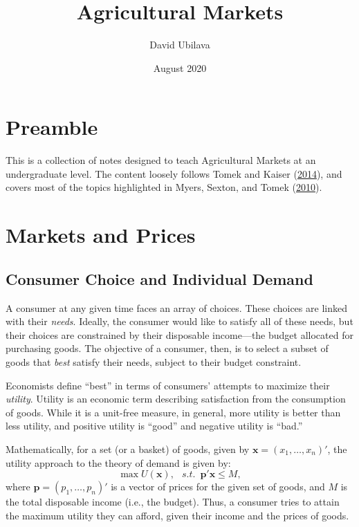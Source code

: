 \documentclass[]{book}
\title{Agricultural Markets}
\author{David Ubilava}
\date{August 2020}
\begin{document}
\maketitle

{
\setcounter{tocdepth}{1}
\tableofcontents
}
\chapter*{Preamble}\label{preamble}

This is a collection of notes designed to teach Agricultural Markets at
an undergraduate level. The content loosely follows Tomek and Kaiser
(\protect\hyperlink{ref-tomek2014}{2014}), and covers most of the topics
highlighted in Myers, Sexton, and Tomek
(\protect\hyperlink{ref-myers2010}{2010}).

\chapter{Markets and Prices}\label{markets-and-prices}

\section{Consumer Choice and Individual
Demand}\label{consumer-choice-and-individual-demand}

A consumer at any given time faces an array of choices. These choices
are linked with their \emph{needs}. Ideally, the consumer would like to
satisfy all of these needs, but their choices are constrained by their
disposable income---the budget allocated for purchasing goods. The
objective of a consumer, then, is to select a subset of goods that
\emph{best} satisfy their needs, subject to their budget constraint.

Economists define ``best'' in terms of consumers' attempts to maximize
their \emph{utility}. Utility is an economic term describing
satisfaction from the consumption of goods. While it is a unit-free
measure, in general, more utility is better than less utility, and
positive utility is ``good'' and negative utility is ``bad.''

Mathematically, for a set (or a basket) of goods, given by
\(\mathbf{x}=(x_1,\ldots,x_n)'\), the utility approach to the theory of
demand is given by:
\[\max U(\mathbf{x}),\;~~s.t.\;~\mathbf{p}'\mathbf{x} \leq M,\] where
\(\mathbf{p}=(p_1,\ldots,p_n)'\) is a vector of prices for the given set
of goods, and \(M\) is the total disposable income (i.e., the budget).
Thus, a consumer tries to attain the maximum utility they can afford,
given their income and the prices of goods.
\end{document}
